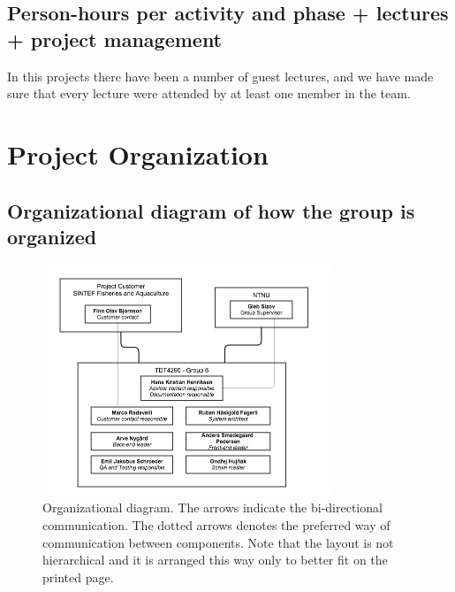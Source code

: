 \documentclass[11pt,a4paper,titlepage,oneside]{report}
\begin{document}
\subsection{Person-hours per activity and phase + lectures + project management}
In this projects there have been a number of guest lectures, and we have made sure that every lecture were attended by at least one member in the team.

\section{Project Organization}
\subsection{Organizational diagram of how the group is organized}

\begin{figure}[h]
\begin{center}
\includegraphics[height=260px,width=328px]{img/tdt4290_group_6_organizational_structure.png}
\caption{Organizational diagram. The arrows indicate the bi-directional communication. The dotted arrows denotes the preferred way of communication between components. Note that the layout is not hierarchical and it is arranged this way only to better fit on the printed page.}
\label{fig:organizational-structure}
\end{center}
\end{figure}
\end{document}
